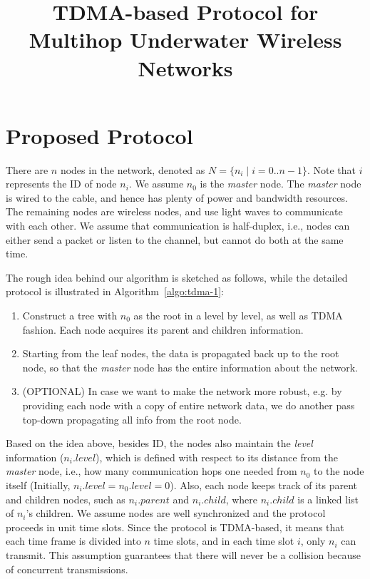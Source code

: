 \documentclass[11pt,letter]{article}
\begin{document}
\title{TDMA-based Protocol for Multihop Underwater Wireless Networks
}


\date{}

\maketitle

\section{Proposed Protocol}

There are $n$ nodes in the network, denoted as $N = \{n_i\mid i=0..n-1\}$. Note that $i$ represents the ID of node $n_i$. We assume $n_0$ is the \emph{master} node. The \emph{master} node is wired to the cable, and hence has plenty of power and bandwidth resources.
The remaining nodes are wireless nodes, and use light waves to communicate with each other. We assume that communication is half-duplex, i.e., nodes can either send a packet or listen to the channel, but cannot do both at the same time.

The rough idea behind our algorithm is sketched as follows, while the detailed protocol is illustrated in Algorithm~\ref{algo:tdma-1}:
\begin{enumerate}
	\item Construct a tree with $n_0$ as the root in a level by level, as well as TDMA fashion. Each node acquires its parent and children information.
	\item Starting from the leaf nodes, the data is propagated back up to the root node, so that the \emph{master} node has the entire information about the network.
	\item (OPTIONAL) In case we want to make the network more robust, e.g. by providing each node with a copy of entire network data, we do another pass top-down propagating all info from the root node.
\end{enumerate}

Based on the idea above, besides ID, the nodes also maintain the \emph{level} information ($n_i.level$), which is defined with respect to its distance from the \emph{master} node, i.e., how many communication hops one needed from $n_0$ to the node itself (Initially, $n_i.level=n_0.level=0$). Also, each node keeps track of its parent and children nodes, such as $n_i.parent$ and $n_i.child$, where $n_i.child$ is a linked list of $n_i$'s children. We assume nodes are well synchronized and the protocol proceeds in unit time slots. Since the protocol is TDMA-based, it means that each time frame is divided into $n$ time slots, and in each time slot $i$, only $n_i$ can transmit. This assumption guarantees that there will never be a collision because of concurrent transmissions.
\end{document}
